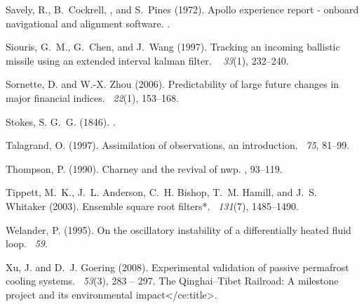 \documentclass[12pt]{report}
\begin{document}
\begin{thebibliography}{}
Savely, R., B.~Cockrell, , and S.~Pines (1972).
\newblock Apollo experience report - onboard navigational and alignment
  software.
.

Siouris, G.~M., G.~Chen, and J.~Wang (1997).
\newblock Tracking an incoming ballistic missile using an extended interval
  kalman filter.
~{\em
  33\/}(1), 232--240.

Sornette, D. and W.-X. Zhou (2006).
\newblock Predictability of large future changes in major financial indices.
~{\em 22\/}(1), 153--168.

Stokes, S. G.~G. (1846).
.

Talagrand, O. (1997).
\newblock Assimilation of observations, an introduction.
~{\em 75},
  81--99.

Thompson, P. (1990).
\newblock Charney and the revival of nwp.
, 93--119.

Tippett, M.~K., J.~L. Anderson, C.~H. Bishop, T.~M. Hamill, and J.~S. Whitaker
  (2003).
\newblock Ensemble square root filters*.
~{\em 131\/}(7), 1485--1490.

Welander, P. (1995).
\newblock On the oscillatory instability of a differentially heated fluid loop.
~{\em 59}.

Xu, J. and D.~J. Goering (2008).
\newblock Experimental validation of passive permafrost cooling systems.
~{\em 53\/}(3), 283 --
  297.
The Qinghai–Tibet Railroad: A milestone project and its
  environmental impact</ce:title>.


\end{thebibliography}
\end{document}
